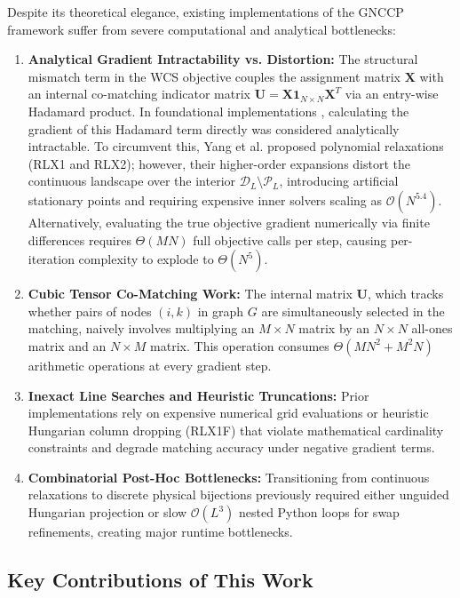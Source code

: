 \documentclass[conference]{IEEEtran}
\begin{document}
Despite its theoretical elegance, existing implementations of the GNCCP framework suffer from severe computational and analytical bottlenecks:
\begin{enumerate}
    \item \textbf{Analytical Gradient Intractability vs. Distortion:} The structural mismatch term in the WCS objective couples the assignment matrix $\mathbf{X}$ with an internal co-matching indicator matrix $\mathbf{U} = \mathbf{X}\mathbf{1}_{N\times N}\mathbf{X}^T$ via an entry-wise Hadamard product. In foundational implementations \cite{yang2018algorithm}, calculating the gradient of this Hadamard term directly was considered analytically intractable. To circumvent this, Yang et al. \cite{yang2018algorithm} proposed polynomial relaxations (RLX1 and RLX2); however, their higher-order expansions distort the continuous landscape over the interior $\mathcal{D}_L \setminus \mathcal{P}_L$, introducing artificial stationary points and requiring expensive inner solvers scaling as $\mathcal{O}(N^{5.4})$. Alternatively, evaluating the true objective gradient numerically via finite differences requires $\Theta(MN)$ full objective calls per step, causing per-iteration complexity to explode to $\Theta(N^5)$.
    \item \textbf{Cubic Tensor Co-Matching Work:} The internal matrix $\mathbf{U}$, which tracks whether pairs of nodes $(i, k)$ in graph $G$ are simultaneously selected in the matching, naively involves multiplying an $M \times N$ matrix by an $N \times N$ all-ones matrix and an $N \times M$ matrix. This operation consumes $\Theta(MN^2 + M^2N)$ arithmetic operations at every gradient step.
    \item \textbf{Inexact Line Searches and Heuristic Truncations:} Prior implementations rely on expensive numerical grid evaluations or heuristic Hungarian column dropping (RLX1F) that violate mathematical cardinality constraints and degrade matching accuracy under negative gradient terms.
    \item \textbf{Combinatorial Post-Hoc Bottlenecks:} Transitioning from continuous relaxations to discrete physical bijections previously required either unguided Hungarian projection or slow $\mathcal{O}(L^3)$ nested Python loops for swap refinements, creating major runtime bottlenecks.
\end{enumerate}

\subsection{Key Contributions of This Work}
\end{document}
